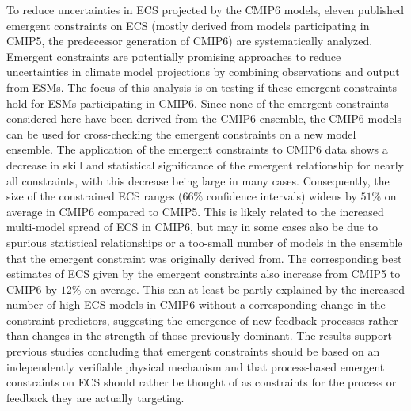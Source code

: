 To reduce uncertainties in \acs{ECS} projected by the \acs{CMIP}6 models,
eleven published emergent constraints on \acs{ECS} (mostly derived from models
participating in \acs{CMIP}5, the predecessor generation of \acs{CMIP}6) are
systematically analyzed. Emergent constraints are potentially promising
approaches to reduce uncertainties in climate model projections by combining
observations and output from \acsp{ESM}. The focus of this analysis is on
testing if these emergent constraints hold for \acsp{ESM} participating in
\acs{CMIP}6. Since none of the emergent constraints considered here have been
derived from the \acs{CMIP}6 ensemble, the \acs{CMIP}6 models can be used for
cross-checking the emergent constraints on a new model ensemble. The
application of the emergent constraints to \acs{CMIP}6 data shows a decrease in
skill and statistical significance of the emergent relationship for nearly all
constraints, with this decrease being large in many cases. Consequently, the
size of the constrained \acs{ECS} ranges ($66 \unit{\%}$ confidence intervals)
widens by $51 \unit{\%}$ on average in \acs{CMIP}6 compared to \acs{CMIP}5.
This is likely related to the increased multi-model spread of \acs{ECS} in
\acs{CMIP}6, but may in some cases also be due to spurious statistical
relationships or a too-small number of models in the ensemble that the emergent
constraint was originally derived from. The corresponding best estimates of
\acs{ECS} given by the emergent constraints also increase from \acs{CMIP}5 to
\acs{CMIP}6 by $12 \unit{\%}$ on average. This can at least be partly explained
by the increased number of high-\acs{ECS} models in \acs{CMIP}6 without a
corresponding change in the constraint predictors, suggesting the emergence of
new feedback processes rather than changes in the strength of those previously
dominant. The results support previous studies concluding that emergent
constraints should be based on an independently verifiable physical mechanism
and that process-based emergent constraints on \acs{ECS} should rather be
thought of as constraints for the process or feedback they are actually
targeting.

